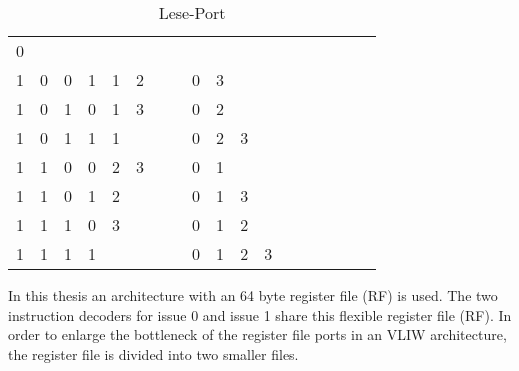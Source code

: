 \begin{table}[]
\begin{minipage}{.4\textwidth}
\begin{tabular}{cccccccccccccccccc}
            \multicolumn{1}{c}{0} & \multicolumn{1}{c}{} & \multicolumn{1}{c}{}& \multicolumn{1}{c}{} \\
            \multicolumn{1}{c}{1} & \multicolumn{1}{c}{0} & \multicolumn{1}{c}{0} & \multicolumn{1}{c}{1} & \multicolumn{1}{|c}{1} & \multicolumn{1}{c}{2} & \multicolumn{1}{c}{}& \multicolumn{1}{c}{} &
            \multicolumn{1}{c}{0} & \multicolumn{1}{c}{3} & \multicolumn{1}{c}{}& \multicolumn{1}{c}{} \\
            \multicolumn{1}{c}{1} & \multicolumn{1}{c}{0} & \multicolumn{1}{c}{1} & \multicolumn{1}{c}{0} & \multicolumn{1}{|c}{1} & \multicolumn{1}{c}{3} & \multicolumn{1}{c}{}& \multicolumn{1}{c}{} &
            \multicolumn{1}{c}{0} & \multicolumn{1}{c}{2} & \multicolumn{1}{c}{}& \multicolumn{1}{c}{} \\
            \multicolumn{1}{c}{1} & \multicolumn{1}{c}{0} & \multicolumn{1}{c}{1} & \multicolumn{1}{c}{1} & \multicolumn{1}{|c}{1} & \multicolumn{1}{c}{} & \multicolumn{1}{c}{}& \multicolumn{1}{c}{} &
            \multicolumn{1}{c}{0} & \multicolumn{1}{c}{2} & \multicolumn{1}{c}{3}& \multicolumn{1}{c}{} \\
            \multicolumn{1}{c}{1} & \multicolumn{1}{c}{1} & \multicolumn{1}{c}{0} & \multicolumn{1}{c}{0} & \multicolumn{1}{|c}{2} & \multicolumn{1}{c}{3} & \multicolumn{1}{c}{}& \multicolumn{1}{c}{} &
            \multicolumn{1}{c}{0} & \multicolumn{1}{c}{1} & \multicolumn{1}{c}{}& \multicolumn{1}{c}{} \\
            \multicolumn{1}{c}{1} & \multicolumn{1}{c}{1} & \multicolumn{1}{c}{0} & \multicolumn{1}{c}{1} & \multicolumn{1}{|c}{2} & \multicolumn{1}{c}{} & \multicolumn{1}{c}{}& \multicolumn{1}{c}{} &
            \multicolumn{1}{c}{0} & \multicolumn{1}{c}{1} & \multicolumn{1}{c}{3}& \multicolumn{1}{c}{} \\
            \multicolumn{1}{c}{1} & \multicolumn{1}{c}{1} & \multicolumn{1}{c}{1} & \multicolumn{1}{c}{0} & \multicolumn{1}{|c}{3} & \multicolumn{1}{c}{} & \multicolumn{1}{c}{}& \multicolumn{1}{c}{} &
            \multicolumn{1}{c}{0} & \multicolumn{1}{c}{1} & \multicolumn{1}{c}{2}& \multicolumn{1}{c}{} \\
            \multicolumn{1}{c}{1} & \multicolumn{1}{c}{1} & \multicolumn{1}{c}{1} & \multicolumn{1}{c}{1} & \multicolumn{1}{|c}{} & \multicolumn{1}{c}{} & \multicolumn{1}{c}{}& \multicolumn{1}{c}{} &
            \multicolumn{1}{c}{0} & \multicolumn{1}{c}{1} & \multicolumn{1}{c}{2}& \multicolumn{1}{c}{3} \\
                  
		\end{tabular}
		\caption{Lese-Port}
	\end{minipage}
\end{table}
In this thesis an architecture  with an 64 byte register file (RF) is used.
The two instruction decoders for issue 0 and issue 1 share this flexible register file (RF). In order to enlarge the bottleneck of the register file ports in an VLIW architecture, the register file is divided into two smaller files.
